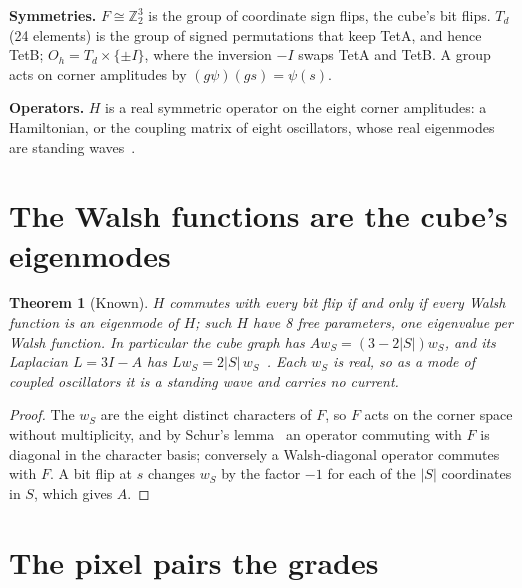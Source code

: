 \documentclass[twocolumn]{iopjournal}
\newtheorem{theorem}{Theorem}
\theoremstyle{definition}
\theoremstyle{remark}
\begin{document}
\textbf{Symmetries.} $F \cong \mathbb Z_2^3$ is the group of coordinate
sign flips, the cube's bit flips. $T_d$ (24 elements) is the group of
signed permutations that keep TetA, and hence TetB; $O_h = T_d \times
\{\pm I\}$, where the inversion $-I$ swaps TetA and TetB. A group acts on
corner amplitudes by $(g\psi)(gs) = \psi(s)$.

\textbf{Operators.} $H$ is a real symmetric operator on the eight corner
amplitudes: a Hamiltonian, or the coupling matrix of eight oscillators,
whose real eigenmodes are standing waves~\cite{NelsonVortex}.


\section{The Walsh functions are the cube's eigenmodes}

\begin{theorem}[Known]
\label{thm:walsh}
$H$ commutes with every bit flip if and only if every Walsh function is
an eigenmode of $H$; such $H$ have 8 free parameters, one eigenvalue per
Walsh function. In particular the cube graph has $Aw_S = (3 -
2\lvert S\rvert)w_S$, and its Laplacian $L = 3I - A$ has $Lw_S =
2\lvert S\rvert\,w_S$~\cite{ODonnell2014}. Each $w_S$ is real, so as a
mode of coupled oscillators it is a standing wave and carries no current.
\end{theorem}

\begin{proof}
The $w_S$ are the eight distinct characters of $F$, so $F$ acts on the
corner space without multiplicity, and by Schur's
lemma~\cite{Serre1977} an operator commuting with $F$ is diagonal in the
character basis; conversely a Walsh-diagonal operator commutes with $F$.
A bit flip at $s$ changes $w_S$ by the factor $-1$ for each of the
$\lvert S\rvert$ coordinates in $S$, which gives $A$.
\end{proof}


\section{The pixel pairs the grades}
\end{document}
